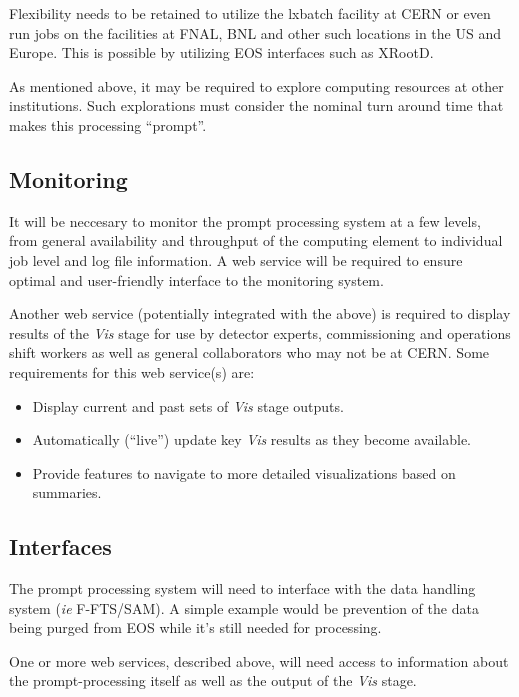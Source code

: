 \documentclass[pdftex,12pt,letter]{article}
\begin{document}
Flexibility needs to be retained to utilize the lxbatch facility at CERN or even run jobs on the facilities at FNAL, BNL and other such locations
in the US and Europe. This is possible by utilizing EOS interfaces such as XRootD.

As mentioned above, it may be required to explore computing resources
at other institutions.  Such explorations must consider the nominal
turn around time that makes this processing ``prompt''.

\subsection{Monitoring}
It will be neccesary to monitor the prompt processing system at a few
levels, from general availability and throughput of the computing
element to individual job level and log file information.  A web
service will be required to ensure optimal and user-friendly interface
to the monitoring system.

Another web service (potentially integrated with the above) is
required to display results of the \textit{Vis} stage for use by
detector experts, commissioning and operations shift workers as well
as general collaborators who may not be at CERN.  Some requirements
for this web service(s) are:

\begin{itemize}
\item Display current and past sets of \textit{Vis} stage outputs.
\item Automatically (``live'') update key \textit{Vis} results as they become available.
\item Provide features to navigate to more detailed visualizations based on summaries.
\end{itemize}


\subsection{Interfaces}
The prompt processing system will need to interface with the data handling system (\textit{ie} F-FTS/SAM). A simple example
would be prevention of the data being purged from EOS while it's still needed for processing.

One or more web services, described above, will need access to
information about the prompt-processing itself as well as the output
of the \textit{Vis} stage.
\end{document}
